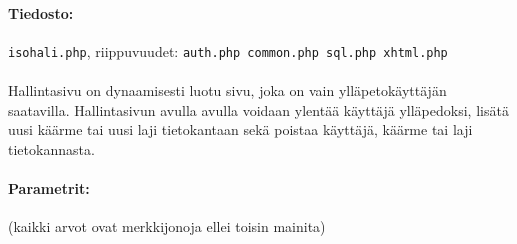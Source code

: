 \documentclass[11pt]{article}
\begin{document}
\paragraph{Tiedosto:} \large{\texttt{isohali.php}}, riippuvuudet: \texttt{auth.php common.php sql.php xhtml.php}

\paragraph{} Hallintasivu on dynaamisesti luotu sivu, joka on vain ylläpetokäyttäjän saatavilla. Hallintasivun avulla avulla voidaan ylentää käyttäjä ylläpedoksi, lisätä uusi käärme tai uusi laji tietokantaan sekä poistaa käyttäjä, käärme tai laji tietokannasta.

\paragraph{Parametrit:} (kaikki arvot ovat merkkijonoja ellei toisin mainita)
\end{document}
